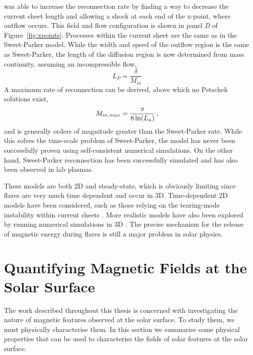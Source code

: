 \cite{Petschek:1964} was able to increase the reconnection rate by finding a way to decrease the current sheet length and allowing a shock at each end of the x-point, where outflow occurs. This field and flow configuration is shown in panel \emph{D} of Figure~\ref{fig:xpoints}. Processes within the current sheet are the same as in the Sweet-Parker model. While the width and speed of the outflow region is the same as Sweet-Parker, the length of the diffusion region is now determined from mass continuity, assuming an incompressible flow,
\begin{equation}
L_{P} = \frac{\delta}{M_{in}}  
\end{equation}
A maximum rate of reconnection can be derived, above which no Petschek solutions exist,
\begin{equation}
M_{in,max} = \frac{\pi}{ 8 \ln(L_u) } \mbox{\,,}
\end{equation}
and is generally orders of magnitude greater than the Sweet-Parker rate. While this solves the time-scale problem of Sweet-Parker, the model has never been successfully proven using self-consistent numerical simulations. On the other hand, Sweet-Parker reconnection has been successfully simulated and has also been observed in lab plasmas. 

These models are both 2D and steady-state, which is obviously limiting since flares are very much time dependent and occur in 3D. Time-dependent 2D models have been considered, such as those relying on the tearing-mode instability within current sheets \citep{Forbes:2006}. More realistic models have also been explored by running numerical simulations in 3D \citep{Yamada:2010}. The precise mechanism for the release of magnetic energy during flares is still a major problem in solar physics. 

\section{Quantifying Magnetic Fields at the Solar Surface}\label{sect:quantmagfield}

The work described throughout this thesis is concerned with investigating the nature of magnetic features observed at the solar surface. To study them, we must physically characterise them. In this section we summarise some physical properties that can be used to characterise the fields of solar features at the solar surface.


